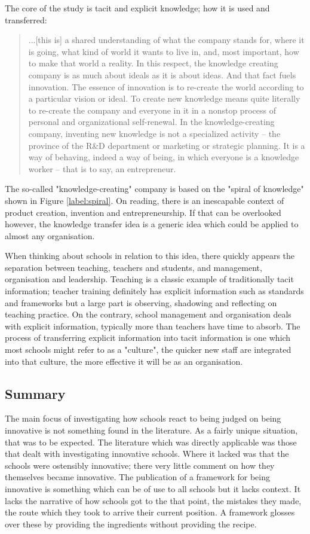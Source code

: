 The core of the study is tacit and explicit knowledge; how it is used and transferred:

\begin{quote}
...[this is] a shared understanding of what the company stands for, where it is going, what kind of world it wants to live in, and, most important, how to make that world a reality. In this respect, the knowledge creating company is as much about ideals as it is about ideas. And that fact fuels innovation. The essence of innovation is to re-create the world according to a particular vision or ideal. To create new knowledge means quite literally to re-create the company and everyone in it in a nonstop process of personal and organizational self-renewal. In the knowledge-creating company, inventing new knowledge is not a specialized activity – the province of the R&D department or marketing or strategic planning. It is a way of behaving, indeed a way of being, in which everyone is a knowledge worker – that is to say, an entrepreneur.
\end{quote}

The so-called "knowledge-creating" company is based on the "spiral of knowledge" shown in Figure \ref{label:spiral}. On reading, there is an inescapable context of product creation, invention and entrepreneurship. If that can be overlooked however, the knowledge transfer idea is a generic idea which could be applied to almost any organisation.

When thinking about schools in relation to this idea, there quickly appears the separation between teaching, teachers and students, and management, organisation and leadership. Teaching is a classic example of traditionally tacit information; teacher training definitely has explicit information such as standards and frameworks but a large part is observing, shadowing and reflecting on teaching practice. On the contrary, school management and organisation deals with explicit information, typically more than teachers have time to absorb. The process of transferring explicit information into tacit information is one which most schools might refer to as a "culture", the quicker new staff are integrated into that culture, the more effective it will be as an organisation.

\subsection{Summary}
The main focus of investigating how schools react to being judged on being innovative is not something found in the literature. As a fairly unique situation, that was to be expected. The literature which was directly applicable was those that dealt with investigating innovative schools. Where it lacked was that the schools were ostensibly innovative; there very little comment on how they themselves became innovative. The publication of a framework for being innovative is something which can be of use to all schools but it lacks context. It lacks the narrative of how schools got to the that point, the mistakes they made, the route which they took to arrive their current position. A framework glosses over these by providing the ingredients without providing the recipe.

